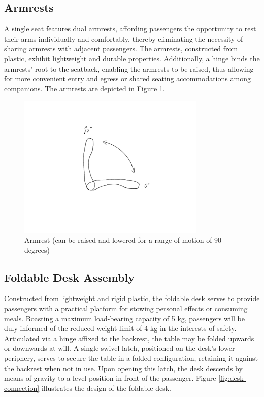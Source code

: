 \subsection{Armrests}
A single seat features dual armrests, affording passengers the opportunity to rest their arms individually and comfortably, thereby eliminating the necessity of sharing armrests with adjacent passengers. The armrests, constructed from plastic, exhibit lightweight and durable properties. Additionally, a hinge binds the armrests' root to the seatback, enabling the armrests to be raised, thus allowing for more convenient entry and egress or shared seating accommodations among companions. The armrests are depicted in Figure \ref{fig:armrest-connection}.

\begin{figure}[!htp]
    \centering
    \includegraphics[width=0.8\textwidth]{images/Armrest.png}
    \caption{Armrest (can be raised and lowered for a range of motion of 90 degrees)}
    \label{fig:armrest-connection}
\end{figure}

\subsection{Foldable Desk Assembly}
Constructed from lightweight and rigid plastic, the foldable desk serves to provide passengers with a practical platform for stowing personal effects or consuming meals. Boasting a maximum load-bearing capacity of 5 kg, passengers will be duly informed of the reduced weight limit of 4 kg in the interests of safety. Articulated via a hinge affixed to the backrest, the table may be folded upwards or downwards at will. A single swivel latch, positioned on the desk's lower periphery, serves to secure the table in a folded configuration, retaining it against the backrest when not in use. Upon opening this latch, the desk descends by means of gravity to a level position in front of the passenger. Figure \ref{fig:desk-connection} illustrates the design of the foldable desk.


